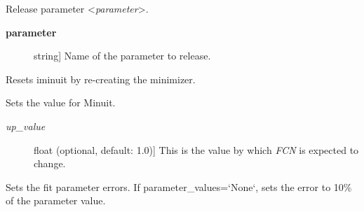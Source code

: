 \documentclass[a4paper,10pt,english]{sphinxmanual}
\begin{document}
\begin{fulllineitems}

\begin{fulllineitems}
\label{index:kafe.iminuit_wrapper.IMinuit.release_parameter}
Release parameter \textless{}\emph{parameter}\textgreater{}.
\begin{description}
\item[{\textbf{parameter}}] \leavevmode{[}string{]}
Name of the parameter to release.

\end{description}

\end{fulllineitems}


\begin{fulllineitems}
\label{index:kafe.iminuit_wrapper.IMinuit.reset}
Resets iminuit by re-creating the minimizer.

\end{fulllineitems}


\begin{fulllineitems}
\label{index:kafe.iminuit_wrapper.IMinuit.set_err}
Sets the  value for Minuit.
\begin{description}
\item[{\emph{up\_value}}] \leavevmode{[}float (optional, default: 1.0){]}
This is the value by which \emph{FCN} is expected to change.

\end{description}

\end{fulllineitems}


\begin{fulllineitems}
\label{index:kafe.iminuit_wrapper.IMinuit.set_parameter_errors}
Sets the fit parameter errors. If parameter\_values={}`None{}`, sets the
error to 10\% of the parameter value.

\end{fulllineitems}


\end{fulllineitems}
\end{document}
